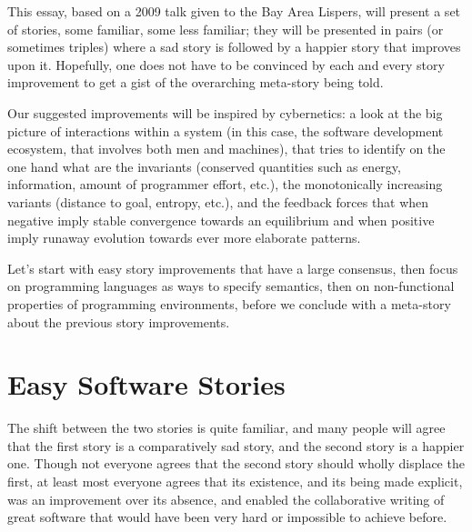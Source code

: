 \documentclass[a4paper,UKenglish]{lipics}
\begin{document}
This essay, based on a 2009 talk given to the Bay Area Lispers,
will present a set of stories, some familiar, some less familiar;
they will be presented in pairs (or sometimes triples)
where a sad story is followed by a happier story that improves upon it.
Hopefully, one does not have to be convinced by each and every story improvement
to get a gist of the overarching meta-story being told.

Our suggested improvements will be inspired by cybernetics:
a look at the big picture of interactions within a system
(in this case, the software development ecosystem, that involves both men and machines),
that tries to identify on the one hand what are the invariants
(conserved quantities such as energy, information,
amount of programmer effort, etc.),
the monotonically increasing variants
(distance to goal, entropy, etc.),
and the feedback forces that when negative imply
stable convergence towards an equilibrium
and when positive imply runaway evolution
towards ever more elaborate patterns.

Let's start with easy story improvements that have a large consensus,
then focus on programming languages as ways to specify semantics,
then on non-functional properties of programming environments,
before we conclude with a meta-story about the previous story improvements.

\section{Easy Software Stories}

The shift between the two stories is quite familiar, and many people will agree that
the first story is a comparatively sad story, and the second story is a happier one.
Though not everyone agrees that the second story should wholly displace the first,
at least most everyone agrees that its existence, and its being made explicit,
was an improvement over its absence, and enabled the collaborative writing of great software
that would have been very hard or impossible to achieve before.
\end{document}
